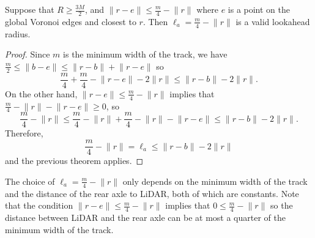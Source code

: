 \begin{corollary}
Suppose that $R \geq \frac{3M}{2}$, and $\lVert r-e \rVert \leq \frac{m}{4} - \lVert r \rVert $ where $e$ is a point on the global Voronoi edges and closest to $r$.
%
Then $\ell_a = \frac{m}{4} - \lVert r \rVert$ is a valid lookahead radius.
\end{corollary}

\begin{proof}
Since $m$ is the minimum width of the track, we have 
$\frac{m}{2} 
\leq  \lVert b-e \rVert
\leq \lVert r-b \rVert + \lVert r-e \rVert$
so
$$\frac{m}{4} + \frac{m}{4} - \lVert r-e \rVert - 2 \lVert r \rVert
\leq \lVert r-b \rVert - 2 \lVert r \rVert.
$$
%
On the other hand, 
$\lVert r-e \rVert \leq \frac{m}{4} - \lVert r \rVert $ 
implies that 
$ \frac{m}{4} - \lVert r \rVert - \lVert r-e \rVert \geq 0$,
so
$$\frac{m}{4} - \lVert r \rVert 
\leq \frac{m}{4} - \lVert r \rVert + \frac{m}{4} - \lVert r \rVert - \lVert r-e \rVert 
\leq \lVert r-b \rVert - 2 \lVert r \rVert.
$$
%
Therefore,
$$\frac{m}{4} - \lVert r \rVert 
= \ell_a
\leq \lVert r-b \rVert - 2 \lVert r \rVert
$$
and the previous theorem applies.
\end{proof}

The choice of $\ell_a = \frac{m}{4} - \lVert r \rVert$ only depends on the minimum width of the track and the distance of the rear axle to LiDAR, both of which are constants.
%
Note that the condition $\lVert r-e \rVert \leq \frac{m}{4} - \lVert r \rVert $ implies that $0 \leq \frac{m}{4} - \lVert r \rVert $ so the distance between LiDAR and the rear axle can be at most a quarter of the minimum width of the track.
